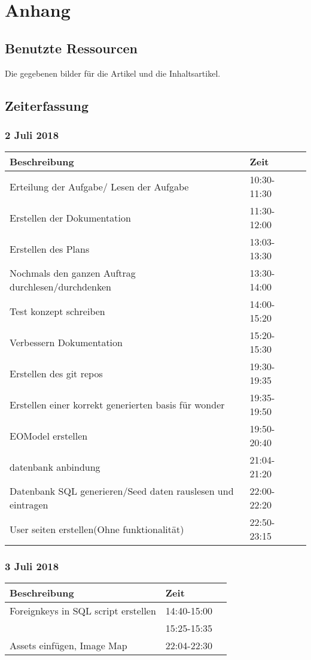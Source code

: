 \documentclass[a4paper, 11pt]{article}
\begin{document}
\section{Anhang}

\subsection{Benutzte Ressourcen}

Die gegebenen bilder für die Artikel und die Inhaltsartikel.

\subsection{Zeiterfassung}

\subsubsection{2 Juli 2018}

\begin{tabular}{llr}
\toprule
Beschreibung & Zeit \\
\midrule
Erteilung der Aufgabe/ Lesen der Aufgabe & 10:30-11:30 \\
Erstellen der Dokumentation & 11:30-12:00 \\
Erstellen des Plans & 13:03-13:30 \\
Nochmals den ganzen Auftrag durchlesen/durchdenken & 13:30-14:00 \\
Test konzept schreiben & 14:00-15:20 \\
Verbessern Dokumentation & 15:20-15:30 \\
Erstellen des git repos & 19:30-19:35 \\
Erstellen einer korrekt generierten basis  für wonder & 19:35-19:50 \\
EOModel erstellen & 19:50-20:40 \\
datenbank anbindung & 21:04-21:20 \\
Datenbank SQL generieren/Seed daten rauslesen und eintragen & 22:00-22:20 \\
User seiten erstellen(Ohne funktionalität) & 22:50-23:15 \\
\bottomrule
\end{tabular}

\subsubsection{3 Juli 2018}

\begin{tabular}{llr}
\toprule
Beschreibung & Zeit \\
\midrule
Foreignkeys in SQL script erstellen & 14:40-15:00 \\
 & 15:25-15:35 \\
Assets einfügen, Image Map & 22:04-22:30 \\
\bottomrule
\end{tabular}
\end{document}
